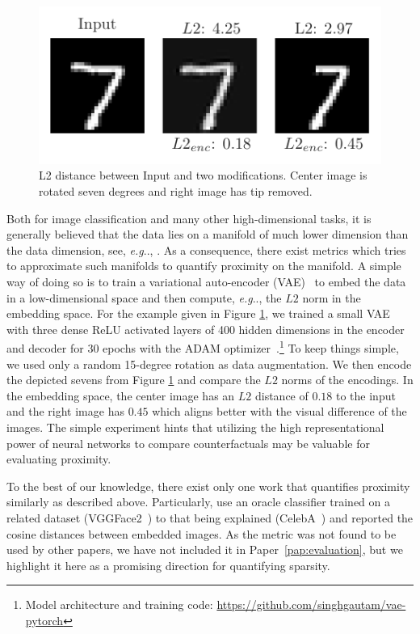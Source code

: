 \documentclass[11pt,a4paper,twoside,openright,final]{memoir}
\makeatletter
\DeclareRobustCommand\onedot{\futurelet\@let@token\@onedot}
\def\@onedot{\ifx\@let@token.\else.\null\fi\xspace}
\def\eg{\emph{e.g}\onedot} \def\Eg{\emph{E.g}\onedot}
\newcommand*{\paperref}[1]{Paper~\hyperref[#1]{\ref{#1}}}
\makeatother
\begin{document}
\begin{figure}
    \centering
    \includegraphics{graphics/l2-example.pdf}
    \caption{L2 distance between Input and two modifications. Center image is rotated seven degrees and right image has tip removed.}
    \label{fig:l2-example}
\end{figure}

Both for image classification and many other high-dimensional tasks, it is generally believed that the data lies on a manifold of much lower dimension than the data dimension, see, \eg, \cite[Sec. 3.11.3]{Goodfellow-et-al-2016}.
As a consequence, there exist metrics which tries to approximate such manifolds to quantify proximity on the manifold.
A simple way of doing so is to train a variational auto-encoder (VAE)~\cite{vae} to embed the data in a low-dimensional space and then compute, \eg, the $L2$ norm in the embedding space.
For the example given in Figure \ref{fig:l2-example}, we trained a small VAE with three dense ReLU activated layers of 400 hidden dimensions in the encoder and decoder for 30 epochs with the ADAM optimizer~\cite{adam}.\footnote{Model architecture and training code: \url{https://github.com/singhgautam/vae-pytorch}}
To keep things simple, we used only a random 15-degree rotation as data augmentation.
We then encode the depicted sevens from Figure \ref{fig:l2-example} and compare the $L2$ norms of the encodings.
In the embedding space, the center image has an $L2$ distance of $0.18$ to the input and the right image has $0.45$ which aligns better with the visual difference of the images.
The simple experiment hints that utilizing the high representational power of neural networks to compare counterfactuals may be valuable for evaluating proximity.

To the best of our knowledge, there exist only one work that quantifies proximity similarly as described above.
Particularly, \citet{Rodriguez2021} use an oracle classifier trained on a related dataset (VGGFace2~\cite{vgg2faces}) to that being explained (CelebA~\cite{celeba}) and reported the cosine distances between embedded images.
As the metric was not found to be used by other papers, we have not included it in \paperref{pap:evaluation}, but we highlight it here as a promising direction for quantifying sparsity.
\end{document}
